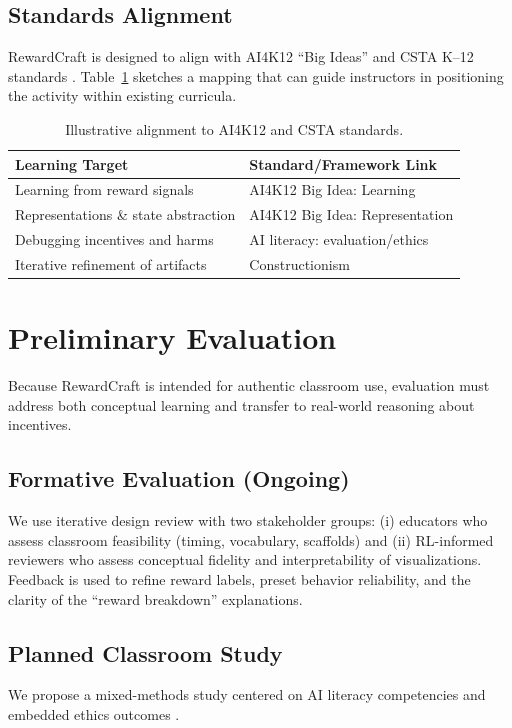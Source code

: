 \documentclass[conference]{IEEEtran}
\begin{document}
\subsection{Standards Alignment}
RewardCraft is designed to align with AI4K12 “Big Ideas” \cite{touretzky2019} and CSTA K--12 standards \cite{k12csta2017}. Table~\ref{tab:standards} sketches a mapping that can guide instructors in positioning the activity within existing curricula.

\begin{table}[t]
\caption{Illustrative alignment to AI4K12 and CSTA standards.}
\label{tab:standards}
\centering
\begin{tabular}{@{}ll@{}}
\toprule
\textbf{Learning Target} & \textbf{Standard/Framework Link} \\
\midrule
Learning from reward signals & AI4K12 Big Idea: Learning \\
Representations \& state abstraction & AI4K12 Big Idea: Representation \\
Debugging incentives and harms & AI literacy: evaluation/ethics \cite{long2020} \\
Iterative refinement of artifacts & Constructionism \cite{papert1980,kafai2014} \\
\bottomrule
\end{tabular}
\end{table}

\section{Preliminary Evaluation}\label{sec:eval}
Because RewardCraft is intended for authentic classroom use, evaluation must address both conceptual learning and transfer to real-world reasoning about incentives.

\subsection{Formative Evaluation (Ongoing)}
We use iterative design review with two stakeholder groups: (i) educators who assess classroom feasibility (timing, vocabulary, scaffolds) and (ii) RL-informed reviewers who assess conceptual fidelity and interpretability of visualizations. Feedback is used to refine reward labels, preset behavior reliability, and the clarity of the “reward breakdown” explanations.

\subsection{Planned Classroom Study}
We propose a mixed-methods study centered on AI literacy competencies \cite{long2020} and embedded ethics outcomes \cite{williams2022}.
\end{document}
